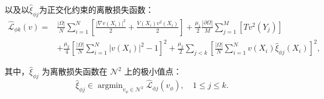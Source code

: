以及以$\widehat{\xi}_{\phi j}$为正交化约束的离散损失函数：
\begin{equation}\label{eq:dislossphi}
\begin{aligned}
\widehat{\mathcal{L}}_{\phi k}(v) = & \frac{|\Omega|}{N}\sum_{i=1}^{N} \left[ \frac{|\nabla v(X_{i})|^{2}}{2}+\frac{V(X_{i})v^{2}(X_{i})}{2}\right]+\frac{\mu_{1}}{2}\frac{|\partial\Omega|}{M}\sum\limits_{j=1}^{M}\left[ Tv^{2}(Y_{j}) \right] \\
&+\frac{\mu_{2}}{4}\left[\frac{|\Omega|}{N}\sum\limits_{i=1}^{N}|v(X_{i})|^{2}-1\right]^{2}+\frac{\mu_{2}}{2}\sum_{j<k}\left[\frac{|\Omega|}{N}\sum\limits_{i=1}^{N}v(X_{i})\widehat{\xi}_{\phi j}(X_{i})\right]^{2},
\end{aligned}
\end{equation}

其中，$\widehat{\xi}_{\phi j}$ 为离散损失函数在 $\mathcal{N}^{2}$ 上的极小值点：
\begin{equation}\label{eq:xi_hat}
\widehat{\xi}_{\phi j}\in\mathop{\arg\min}_{v_{\phi}\in \mathcal{N}^{2}}\widehat{\mathcal{L}}_{\phi j}(v_{\phi}),\quad 1\leq j\leq k.
\end{equation}

